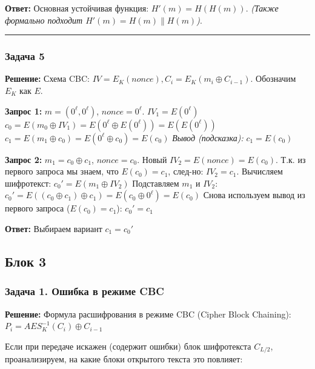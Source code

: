 ﻿\documentclass[9pt,a4paper]{extarticle}
\begin{document}
\textbf{Ответ:} Основная устойчивая функция: \textbf{\(H'(m) = H(H(m))\)}. \emph{(Также формально подходит \(H'(m) = H(m) \parallel H(m)\))}.

\begin{center}\rule{0.5\linewidth}{0.5pt}\end{center}

\subsubsection{Задача 5}\label{ux437ux430ux434ux430ux447ux430-5}

\textbf{Решение:} Схема CBC: \(IV = E_K(nonce), C_i = E_K(m_i \oplus C_{i-1})\). Обозначим \(E_K\) как \(E\).

\textbf{Запрос 1:} \(m = (0^\ell, 0^\ell)\), \(nonce = 0^\ell\). \(IV_1 = E(0^\ell)\) \(c_0 = E(m_0 \oplus IV_1) = E(0^\ell \oplus E(0^\ell)) = E(E(0^\ell))\) \(c_1 = E(m_1 \oplus c_0) = E(0^\ell \oplus c_0) = E(c_0)\) \emph{Вывод (подсказка):} \textbf{\(c_1 = E(c_0)\)}

\textbf{Запрос 2:} \(m_1 = c_0 \oplus c_1\), \(nonce = c_0\). Новый \(IV_2 = E(nonce) = E(c_0)\). Т.к. из первого запроса мы знаем, что \(E(c_0) = c_1\), след-но: \textbf{\(IV_2 = c_1\)}. Вычисляем шифротекст: \(c_0' = E(m_1 \oplus IV_2)\) Подставляем \(m_1\) и \(IV_2\): \(c_0' = E((c_0 \oplus c_1) \oplus c_1) = E(c_0 \oplus 0^\ell) = E(c_0)\) Снова используем вывод из первого запроса (\(E(c_0) = c_1\)): \textbf{\(c_0' = c_1\)}

\textbf{Ответ:} Выбираем вариант \textbf{\(c_1 = c_0'\)}

\subsection{Блок 3}\label{ux431ux43bux43eux43a-3}

\subsubsection{Задача 1. Ошибка в режиме CBC}\label{ux437ux430ux434ux430ux447ux430-1.-ux43eux448ux438ux431ux43aux430-ux432-ux440ux435ux436ux438ux43cux435-cbc}

\textbf{Решение:} Формула расшифрования в режиме CBC (Cipher Block Chaining): \(P_i = AES^{-1}_K(C_i) \oplus C_{i-1}\)

Если при передаче искажен (содержит ошибки) блок шифротекста \(C_{L/2}\), проанализируем, на какие блоки открытого текста это повлияет:
\end{document}
